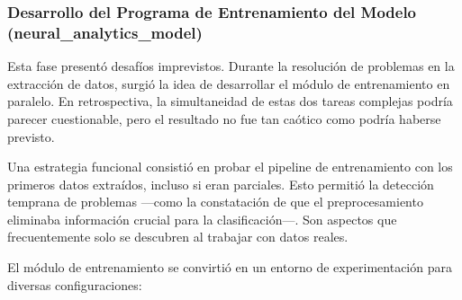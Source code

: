 \subsubsection{Desarrollo del Programa de Entrenamiento del Modelo (neural\_analytics\_model)}

Esta fase presentó desafíos imprevistos. Durante la resolución de problemas en la extracción de datos, surgió la idea de desarrollar el módulo de entrenamiento en paralelo. En retrospectiva, la simultaneidad de estas dos tareas complejas podría parecer cuestionable, pero el resultado no fue tan caótico como podría haberse previsto.

Una estrategia funcional consistió en probar el pipeline de entrenamiento con los primeros datos extraídos, incluso si eran parciales. Esto permitió la detección temprana de problemas —como la constatación de que el preprocesamiento eliminaba información crucial para la clasificación—. Son aspectos que frecuentemente solo se descubren al trabajar con datos reales.

El módulo de entrenamiento se convirtió en un entorno de experimentación para diversas configuraciones:

